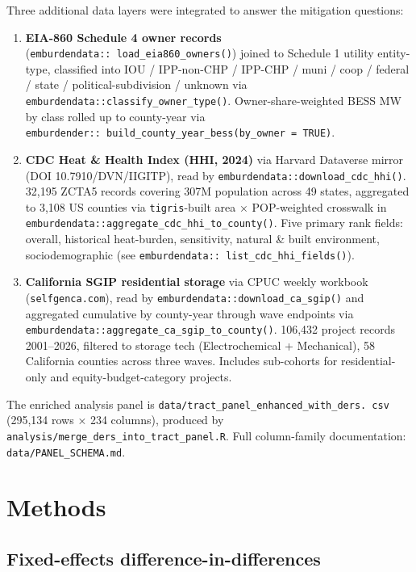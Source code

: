 \documentclass[
]{article}
\begin{document}
Three additional data layers were integrated to answer the mitigation
questions:

\begin{enumerate}
\def\labelenumi{\arabic{enumi}.}
\item
  \textbf{EIA-860 Schedule 4 owner records}
  (\texttt{emburdendata::\ load\_eia860\_owners()}) joined to Schedule 1
  utility entity-type, classified into IOU / IPP-non-CHP / IPP-CHP /
  muni / coop / federal / state / political-subdivision / unknown via
  \texttt{emburdendata::classify\_owner\_type()}. Owner-share-weighted
  BESS MW by class rolled up to county-year via
  \texttt{emburdender::\ build\_county\_year\_bess(by\_owner\ =\ TRUE)}.
\item
  \textbf{CDC Heat \& Health Index (HHI, 2024)} via Harvard Dataverse
  mirror (DOI 10.7910/DVN/IIGITP), read by
  \texttt{emburdendata::download\_cdc\_hhi()}. 32,195 ZCTA5 records
  covering 307M population across 49 states, aggregated to 3,108 US
  counties via \texttt{tigris}-built area × POP-weighted crosswalk in
  \texttt{emburdendata::aggregate\_cdc\_hhi\_to\_county()}. Five primary
  rank fields: overall, historical heat-burden, sensitivity, natural \&
  built environment, sociodemographic (see
  \texttt{emburdendata::\ list\_cdc\_hhi\_fields()}).
\item
  \textbf{California SGIP residential storage} via CPUC weekly workbook
  (\texttt{selfgenca.com}), read by
  \texttt{emburdendata::download\_ca\_sgip()} and aggregated cumulative
  by county-year through wave endpoints via
  \texttt{emburdendata::aggregate\_ca\_sgip\_to\_county()}. 106,432
  project records 2001--2026, filtered to storage tech (Electrochemical
  + Mechanical), 58 California counties across three waves. Includes
  sub-cohorts for residential-only and equity-budget-category projects.
\end{enumerate}

The enriched analysis panel is
\texttt{data/tract\_panel\_enhanced\_with\_ders.\ csv} (295,134 rows ×
234 columns), produced by
\texttt{analysis/merge\_ders\_into\_tract\_panel.R}. Full column-family
documentation: \texttt{data/PANEL\_SCHEMA.md}.

\hypertarget{methods}{%
\section{Methods}\label{methods}}

\hypertarget{fixed-effects-difference-in-differences}{%
\subsection{Fixed-effects
difference-in-differences}\label{fixed-effects-difference-in-differences}}
\end{document}
